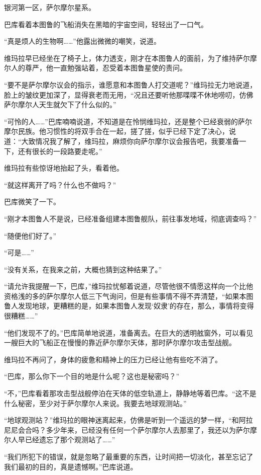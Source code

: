 银河第一区，萨尔摩尔星系。

巴库看着本图鲁的飞船消失在黑暗的宇宙空间，轻轻出了一口气。

“真是烦人的生物啊……”他露出微微的嘲笑，说道。

维玛拉早已经坐在了椅子上，体力透支，刚才在本图鲁人的面前，为了维持萨尔摩尔人的尊严，他一直勉强站着，忍受着本图鲁星使的责问。

“要不是萨尔摩尔议会的指示，谁愿意和本图鲁人打交道呢？”维玛拉无力地说道，脸上的皱纹更加深了，显得衰老而无用，“况且还要听他那喋喋不休地唠叨，仿佛萨尔摩尔人天生就欠下了什么似的。”

“可怜的人……”巴库喃喃说道，不知道是在怜悯维玛拉，还是整个已经衰弱的萨尔摩尔民族。他习惯性的将双手合在一起，搓了搓，似乎已经下定了决心，说道：“大致情况我了解了，维玛拉，麻烦你向萨尔摩尔议会报告吧，我要准备一下，还有很长的一段路要走呢。”

维玛拉有些惊讶地抬起了头，看着他。

“就这样离开了吗？什么也不做吗？”

巴库微笑了一下。

“刚才本图鲁人不是说，已经准备组建本图鲁舰队，前往事发地域，彻底调查吗？”

“随便他们好了。”

“可是……”

“没有关系，在我来之前，大概也猜到这种结果了。”

“请允许我提醒一下，巴库，”维玛拉忧郁着说道，尽管他很不情愿这样向一个比他资格浅的多的萨尔摩尔人低三下气询问，但是有些事情不得不弄清楚，“如果本图鲁人发现地球，更糟糕的是，如果本图鲁人发现‘奴隶’的存在，那么，事情将变得很糟糕……”

“他们发现不了的。”巴库简单地说道，准备离去。在巨大的透明舷窗外，可以看见一艘巨大的飞船正在慢慢的靠近萨尔摩尔天体，那时萨尔摩尔攻击型战舰。

维玛拉不再问了，身体的疲惫和精神上的压力已经让他有些吃不消了。

“巴库，那么你下一个目的地是什么呢？这也是秘密吗？”

“不，”巴库看着那攻击型战舰停泊在天体的低空轨道上，静静地等着巴库。“这不是什么秘密，至少对于萨尔摩尔人来说。我要去地球观测站。”

“地球观测站？”维玛拉的眼神迷离起来，仿佛是听到一个遥远的梦一样，“和阿拉尼尼会合吗？多少年来，已经没有任何一个萨尔摩尔人去那里了，我还以为萨尔摩尔人早已经遗忘了那个观测站了……”

“我们所犯下的错误，就是忽略了最重要的东西，让时间把一切淡化，甚至忘记了我们最初的目的，真是遗憾啊。”巴库说道。

